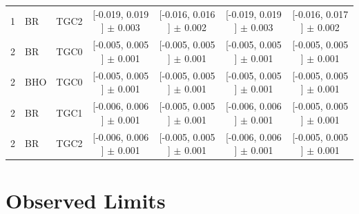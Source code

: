 \begin{landscape}
\begin{table}[htbp]
\begin{tabular}{lllcccc}
 1 & BR  & TGC2 &  [-0.019, 0.019 ] $\pm$ 0.003 &  [-0.016, 0.016 ] $\pm$ 0.002 &  [-0.019, 0.019 ] $\pm$ 0.003 &  [-0.016, 0.017 ] $\pm$ 0.002 \\
 2 & BR  & TGC0 &  [-0.005, 0.005 ] $\pm$ 0.001 &  [-0.005, 0.005 ] $\pm$ 0.001 &  [-0.005, 0.005 ] $\pm$ 0.001 &  [-0.005, 0.005 ] $\pm$ 0.001 \\
 2 & BHO & TGC0 &  [-0.005, 0.005 ] $\pm$ 0.001 &  [-0.005, 0.005 ] $\pm$ 0.001 &  [-0.005, 0.005 ] $\pm$ 0.001 &  [-0.005, 0.005 ] $\pm$ 0.001 \\
 2 & BR  & TGC1 &  [-0.006, 0.006 ] $\pm$ 0.001 &  [-0.005, 0.005 ] $\pm$ 0.001 &  [-0.006, 0.006 ] $\pm$ 0.001 &  [-0.005, 0.005 ] $\pm$ 0.001 \\
 2 & BR  & TGC2 &  [-0.006, 0.006 ] $\pm$ 0.001 &  [-0.005, 0.005 ] $\pm$ 0.001 &  [-0.006, 0.006 ] $\pm$ 0.001 &  [-0.005, 0.005 ] $\pm$ 0.001 \\
\hline\hline
\end{tabular}
\end{table}
 \end{landscape}

\section{Observed Limits}


